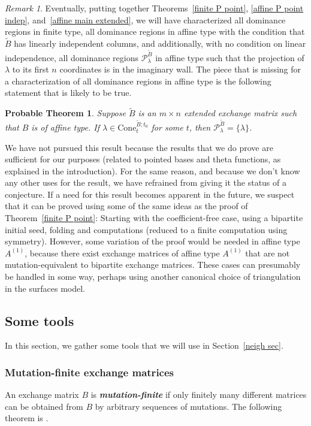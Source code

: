 \documentclass{amsart}
\newtheorem{probable}[proposition]{Probable Theorem}
\theoremstyle{definition}
\theoremstyle{remark}
\newtheorem{remark}[proposition]{Remark}
\numberwithin{equation}{section}
\newcommand{\newword}[1]{\textbf{\emph{#1}}}
\newcommand{\set}[1]{{\lbrace #1 \rbrace}}
\newcommand{\0}{{\mathbf{0}}}
\newcommand{\Cone}{\mathrm{Cone}}
\newcommand{\tB}{{\widetilde{B}}}
\renewcommand{\P}{\mathcal{P}}
\newcommand{\afftype}[1]{{#1^{(1)}}}
\begin{document}
\begin{remark}\label{affine P point remark}
Eventually, putting together Theorems~\ref{finite P point}, \ref{affine P point indep}, and~\ref{affine main extended}, we will have characterized all dominance regions in finite type, all dominance regions in affine type with the condition that $\tB$ has linearly independent columns, and additionally, with no condition on linear independence, all dominance regions $\P_\lambda^\tB$ in affine type such that the projection of $\lambda$ to its first $n$ coordinates is in the imaginary wall.
The piece that is missing for a characterization of all dominance regions in affine type is the following statement that is likely to be true.

\begin{probable}\label{affine P point} 
Suppose $\tB$ is an $m\times n$ extended exchange matrix such that $B$ is of affine type.
If $\lambda\in\Cone^{\tB;t_0}_t$ for some $t$, then $\P^\tB_\lambda=\set{\lambda}$.
\end{probable}

We have not pursued this result because the results that we do prove are sufficient for our purposes (related to pointed bases and theta functions, as explained in the introduction).
For the same reason, and because we don't know any other uses for the result, we have refrained from giving it the status of a conjecture. 
If a need for this result becomes apparent in the future, we suspect that it can be proved using some of the same ideas as the proof of Theorem~\ref{finite P point}:
Starting with the coefficient-free case, using a bipartite initial seed, folding and computations (reduced to a finite computation using symmetry).
However, some variation of the proof would be needed in affine type $\afftype A$, because there exist exchange matrices of affine type $\afftype A$ that are not mutation-equivalent to bipartite exchange matrices.
These cases can presumably be handled in some way, perhaps using another canonical choice of triangulation in the surfaces model.
\end{remark}


\subsection{Some tools}
In this section, we gather some tools that we will use in Section~\ref{neigh sec}.

\subsubsection{Mutation-finite exchange matrices}\label{mut fin sec}
An exchange matrix $B$ is \newword{mutation-finite} if only finitely many different matrices can be obtained from $B$ by arbitrary sequences of mutations.
The following theorem is \cite[Theorem~2.8]{FeShTu}.  
\end{document}
